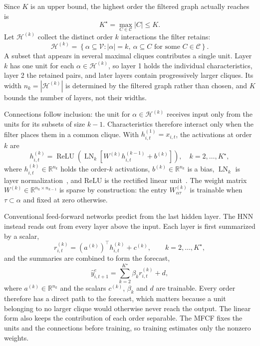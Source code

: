 \documentclass[sigconf,nonacm]{acmart}
\begin{document}
Since \(K\) is an upper bound, the highest order the filtered graph actually
reaches is
\begin{equation}
 K^{\star}=\max_{C\in\mathcal C}|C|\leq K .
 \label{eq:kstar}
\end{equation}
Let \(\mathcal H^{(k)}\) collect the distinct order \(k\) interactions the filter
retains:
\begin{equation}
 \mathcal H^{(k)}
 =
 \left\{
 \alpha\subseteq\mathcal V:
 |\alpha|=k,\
 \alpha\subseteq C
 \text{ for some }C\in\mathcal C
 \right\}.
 \label{eq:complex}
\end{equation}
A subset that appears in several maximal cliques contributes a single unit.
Layer \(k\) has one unit for each \(\alpha\in\mathcal H^{(k)}\), so layer 1
holds the individual characteristics, layer 2 the retained pairs, and later
layers contain progressively larger cliques. Its width \(n_k=|\mathcal H^{(k)}|\) is
determined by the filtered graph rather than chosen, and \(K\) bounds the
number of layers, not their widths.

Connections follow inclusion: the unit for \(\alpha\in\mathcal H^{(k)}\)
receives input only from the units for its subsets of size \(k-1\).
Characteristics therefore interact only when the filter places them in a common
clique. With \(h^{(1)}_{i,t}=x_{i,t}\), the activations at order \(k\) are
\begin{equation}
 h^{(k)}_{i,t}
 =
 \operatorname{ReLU}\!\left(
 \operatorname{LN}_{k}\!\left[
 W^{(k)}h^{(k-1)}_{i,t}+b^{(k)}
 \right]\right),
 \quad k=2,\ldots,K^{\star},
 \label{eq:hnnlayer}
\end{equation}
where \(h^{(k)}_{i,t}\in\mathbb{R}^{n_k}\) holds the order-\(k\) activations,
\(b^{(k)}\in\mathbb{R}^{n_k}\) is a bias, \(\operatorname{LN}_{k}\) is layer
normalization~\cite{ba2016}, and ReLU is the rectified linear unit~\cite{nair2010}. The weight
matrix \(W^{(k)}\in\mathbb{R}^{n_k\times n_{k-1}}\) is sparse by construction:
the entry \(W^{(k)}_{\alpha\tau}\) is trainable when \(\tau\subset\alpha\) and
fixed at zero otherwise.

Conventional feed-forward networks predict from the last hidden layer. The HNN
instead reads out from every layer above the input. Each layer is first
summarized by a scalar,
\begin{equation}
 r^{(k)}_{i,t}
 =
 (a^{(k)})^\top h^{(k)}_{i,t}+c^{(k)},
 \qquad k=2,\ldots,K^{\star},
 \label{eq:layer-readout}
\end{equation}
and the summaries are combined to form the forecast,
\begin{equation}
 \widehat y^{e}_{i,t+1}
 =
 \sum_{k=2}^{K^{\star}}\beta_k r^{(k)}_{i,t}+d,
 \label{eq:hnn-readout}
\end{equation}
where \(a^{(k)}\in\mathbb{R}^{n_k}\) and the scalars \(c^{(k)}\), \(\beta_k\)
and \(d\) are trainable.
 Every order therefore has a direct path to the
forecast, which matters because a unit belonging to no larger clique would
otherwise never reach the output. The linear form also keeps the contribution
of each order separable. The MFCF fixes the units and the connections before
training, so training estimates only the nonzero weights.
\end{document}

